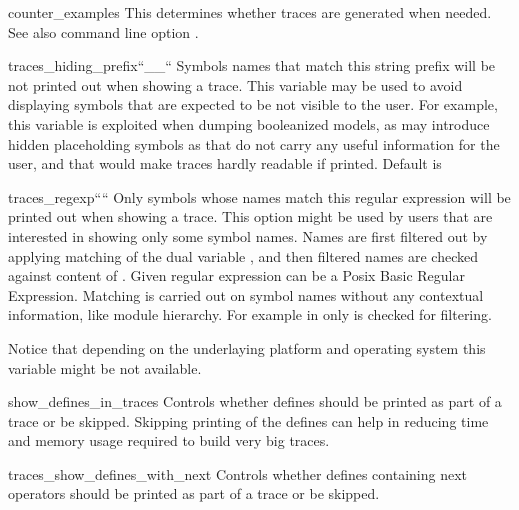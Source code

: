 \begin{nusmvVar} {counter\_examples}{}{}
This determines whether traces are generated when needed. See also
command line option .
\end{nusmvVar}

\begin{nusmvVar} {traces\_hiding\_prefix}{}{``\_\_``}
Symbols names that match this string prefix will be not printed
out when showing a trace. This variable may be used to avoid
displaying symbols that are expected to be not visible to the
user. For example, this variable is exploited when dumping
booleanized models, as \nusmv may introduce hidden placeholding
symbols as  that do not carry any useful information
for the user, and that would make traces hardly readable if
printed. Default is \code{\_\_}
\end{nusmvVar}

\begin{nusmvVar} {traces\_regexp}{}{````}
Only symbols whose names match this regular expression will be
printed out when showing a trace. This option might be used by
users that are interested in showing only some symbol names. Names
are first filtered out by applying matching of the dual
variable , and then
filtered names are checked against content
of . Given regular expression
can be a Posix Basic Regular Expression. Matching is carried out
on symbol names without any contextual information, like module
hierarchy. For example in  only  is
checked for filtering. 

Notice that depending on the underlaying platform and operating
system this variable might be not available.
\end{nusmvVar}

\begin{nusmvVar} {show\_defines\_in\_traces}{}{}
Controls whether defines should be printed as part of a trace or be
skipped. Skipping printing of the defines can help in reducing time
and memory usage required to build very big traces.
\end{nusmvVar}

\begin{nusmvVar} {traces\_show\_defines\_with\_next}{}{}
Controls whether defines containing next operators should be printed
as part of a trace or be skipped.
\end{nusmvVar}

